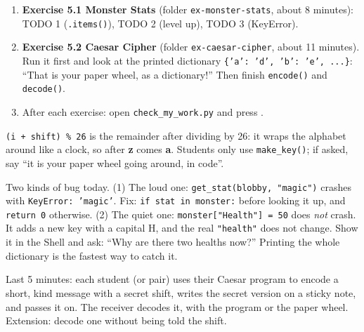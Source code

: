\begin{enumerate}[leftmargin=1.4em]
  \item \textbf{Exercise 5.1 Monster Stats} (folder \texttt{ex-monster-stats}, about 8 minutes): TODO 1 (\texttt{.items()}), TODO 2 (level up), TODO 3 (KeyError).
  \item \textbf{Exercise 5.2 Caesar Cipher} (folder \texttt{ex-caesar-cipher}, about 11 minutes). Run it first and look at the printed dictionary
        \texttt{\{'a': 'd', 'b': 'e', ...\}}: \enquote{That is your paper wheel, as a dictionary!} Then finish \texttt{encode()} and \texttt{decode()}.
  \item After each exercise: open \texttt{check\_my\_work.py} and press .
\end{enumerate}

\begin{teachernote}
\texttt{(i + shift) \% 26} is the remainder after dividing by 26: it wraps the alphabet around like a clock, so after \textbf{z} comes \textbf{a}.
Students only use \texttt{make\_key()}; if asked, say \enquote{it is your paper wheel going around, in code}.
\end{teachernote}

\begin{bughunt}
Two kinds of bug today. (1) The loud one: \texttt{get\_stat(blobby, "magic")} crashes with \texttt{KeyError: 'magic'}. Fix: \texttt{if stat in monster:}
before looking it up, and \texttt{return 0} otherwise. (2) The quiet one: \texttt{monster["Health"] = 50} does \emph{not} crash. It adds a new
key with a capital H, and the real \texttt{"health"} does not change. Show it in the Shell and ask: \enquote{Why are there two healths now?}
Printing the whole dictionary is the fastest way to catch it.
\end{bughunt}

\begin{freebuild}
Last 5 minutes: each student (or pair) uses their Caesar program to encode a short, kind message with a secret shift,
writes the secret version on a sticky note, and passes it on. The receiver decodes it, with the program or the paper wheel.
Extension: decode one without being told the shift.
\end{freebuild}

